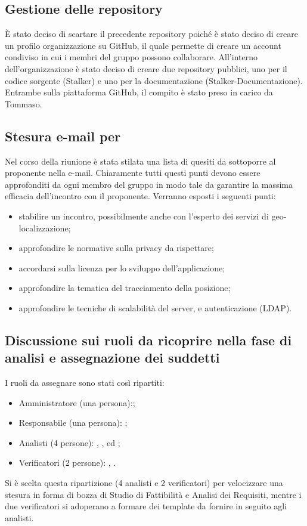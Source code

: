 \subsection{Gestione delle repository}
È stato deciso di scartare il precedente repository poiché è stato deciso di creare un profilo organizzazione su GitHub, il quale permette di creare un account condiviso in cui i membri del gruppo possono collaborare.
All'interno dell'organizzazione è stato deciso di creare due repository pubblici, uno per il codice sorgente (Stalker) e uno per la documentazione (Stalker-Documentazione).
Entrambe sulla piattaforma GitHub, il compito è stato preso in carico da Tommaso. 

\subsection{Stesura e-mail per \Proponente{}}
Nel corso della riunione è stata stilata una lista di quesiti da sottoporre al proponente nella e-mail. 
Chiaramente tutti questi punti devono essere approfonditi da ogni membro del gruppo in modo tale da garantire la massima efficacia dell'incontro con il proponente.
Verranno esposti i seguenti punti:
\begin{itemize}
\item stabilire un incontro, possibilmente anche con l'esperto dei servizi di geo-localizzazione;
\item approfondire le normative sulla privacy da rispettare;
\item accordarsi sulla licenza per lo sviluppo dell'applicazione;
\item approfondire la tematica del tracciamento della posizione;
\item approfondire le tecniche di scalabilità del server, e autenticazione (LDAP).
\end{itemize} 

\subsection{Discussione sui ruoli da ricoprire nella fase di analisi e assegnazione dei suddetti}
I ruoli da assegnare sono stati così ripartiti: 
\begin{itemize}
\item Amministratore (una persona):\AT{};
\item Responsabile (una persona): \SE{};
\item Analisti (4 persone): \LD{}, \BR{}, \PF{} ed \CE{};
\item Verificatori (2 persone): \DF{}, \MC{}.
\end{itemize}
Si è scelta questa ripartizione (4 analisti e 2 verificatori) per velocizzare una stesura in forma di bozza di Studio di Fattibilità e Analisi dei Requisiti, mentre i due verificatori si adoperano a formare dei template da fornire in seguito agli analisti.

